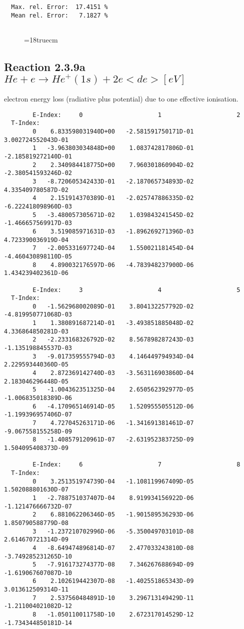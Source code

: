 \begin{verbatim}
  Max. rel. Error:  17.4151 %
  Mean rel. Error:   7.1827 %


\end{verbatim}
\begin{figure} \label{2.1.8lr2o}
\epsfxsize=18truecm
\end{figure}
\newpage


\subsection{
  Reaction 2.3.9a  $He + e \rightarrow He^+(1s) + 2e   <de> [eV] $
}

  electron energy loss (radiative plus potential) due to one effective ionisation.

\begin{verbatim}
        E-Index:     0                     1                     2
  T-Index:
        0    6.833598031940D+00   -2.581591750171D-01    3.002724552043D-01
        1   -3.963803034848D+00    1.083742817806D-01   -2.185819272140D-01
        2    2.340984418775D+00    7.960301860904D-02   -2.380541593246D-02
        3   -8.720605342433D-01   -2.187065734893D-02    4.335409780587D-02
        4    2.151914370389D-01   -2.025747886335D-02   -6.222418098960D-03
        5   -3.480057305671D-02    1.039843241545D-02   -1.466657569917D-03
        6    3.519085971631D-03   -1.896269271396D-03    4.723390036919D-04
        7   -2.005331697724D-04    1.550021181454D-04   -4.460430898110D-05
        8    4.890032176597D-06   -4.783948237900D-06    1.434239402361D-06

        E-Index:     3                     4                     5
  T-Index:
        0   -1.562968002089D-01    3.804132257792D-02   -4.819950771068D-03
        1    1.380891687214D-01   -3.493851885048D-02    4.336864850281D-03
        2   -2.233168326792D-02    8.567898287243D-03   -1.135198845537D-03
        3   -9.017359555794D-03    4.146449794934D-04    2.229593440360D-05
        4    2.872369142740D-03   -3.563116903860D-04    2.183046296448D-05
        5   -1.004362351325D-04    2.650562392977D-05   -1.006835018389D-06
        6   -4.170965146914D-05    1.520955505512D-06   -1.199396957406D-07
        7    4.727045263171D-06   -1.341691381461D-07   -9.067558155258D-09
        8   -1.408579120961D-07   -2.631952383725D-09    1.504095408373D-09

        E-Index:     6                     7                     8
  T-Index:
        0    3.251351974739D-04   -1.108119967409D-05    1.502088801630D-07
        1   -2.788751037407D-04    8.919934156922D-06   -1.121476666732D-07
        2    6.881062206346D-05   -1.901589536293D-06    1.850790588779D-08
        3   -1.237210702996D-06   -5.350049703101D-08    2.614670721314D-09
        4   -8.649474896814D-07    2.477033243810D-08   -3.749285231265D-10
        5   -7.916173274377D-08    7.346267688694D-09   -1.619067607087D-10
        6    2.102619442307D-08   -1.402551865343D-09    3.013612509314D-11
        7    2.537560484891D-10    3.296713149429D-11   -1.211004021082D-12
        8   -1.050110011758D-10    2.672317014529D-12   -1.734344850181D-14


\end{verbatim}
